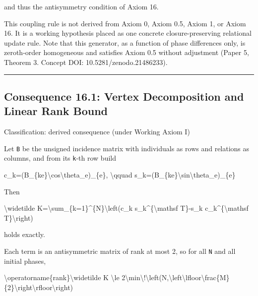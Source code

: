 \documentclass[
  a4paper,
]{article}
\newenvironment{Shaded}{}{}
\newcommand{\NormalTok}[1]{#1}
\begin{document}
and thus the antisymmetry condition of Axiom 16.

This coupling rule is not derived from Axiom 0, Axiom 0.5, Axiom 1, or
Axiom 16. It is a working hypothesis placed as one concrete
closure-preserving relational update rule. Note that this generator, as
a function of phase differences only, is zeroth-order homogeneous and
satisfies Axiom 0.5 without adjustment (Paper 5, Theorem 3. Concept DOI:
10.5281/zenodo.21486233).

\begin{center}\rule{0.5\linewidth}{0.5pt}\end{center}

\subsection{Consequence 16.1: Vertex Decomposition and Linear Rank
Bound}\label{consequence-16.1-vertex-decomposition-and-linear-rank-bound}

Classification: derived consequence (under Working Axiom I)

Let \texttt{B} be the unsigned incidence matrix with individuals as rows
and relations as columns, and from its \texttt{k}-th row build

\begin{Shaded}
\begin{Highlighting}[]
\NormalTok{c\_k=(B\_\{ke\}\textbackslash{}cos\textbackslash{}theta\_e)\_\{e\},}
\NormalTok{\textbackslash{}qquad}
\NormalTok{s\_k=(B\_\{ke\}\textbackslash{}sin\textbackslash{}theta\_e)\_\{e\}}
\end{Highlighting}
\end{Shaded}

Then

\begin{Shaded}
\begin{Highlighting}[]
\NormalTok{\textbackslash{}widetilde K=\textbackslash{}sum\_\{k=1\}\^{}\{N\}\textbackslash{}left(c\_k s\_k\^{}\{\textbackslash{}mathsf T\}{-}s\_k c\_k\^{}\{\textbackslash{}mathsf T\}\textbackslash{}right)}
\end{Highlighting}
\end{Shaded}

holds exactly.

Each term is an antisymmetric matrix of rank at most 2, so for all
\texttt{N} and all initial phases,

\begin{Shaded}
\begin{Highlighting}[]
\NormalTok{\textbackslash{}operatorname\{rank\}\textbackslash{}widetilde K}
\NormalTok{\textbackslash{}le}
\NormalTok{2\textbackslash{}min\textbackslash{}!\textbackslash{}left(N,\textbackslash{}left\textbackslash{}lfloor\textbackslash{}frac\{M\}\{2\}\textbackslash{}right\textbackslash{}rfloor\textbackslash{}right)}
\end{Highlighting}
\end{Shaded}
\end{document}
